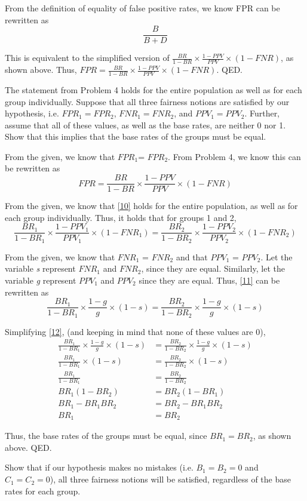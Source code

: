 \documentclass{cisXXX} %
\begin{document}
From the definition of equality of false positive rates, we know FPR can be rewritten as
$$\frac{B}{B+D}$$

This is equivalent to the simplified version of $\frac{BR}{1-BR}\times\frac{1-PPV}{PPV}\times(1 -FNR)$, as shown above. Thus, $FPR = \frac{BR}{1-BR}\times\frac{1-PPV}{PPV}\times(1 -FNR)$. QED.

\HWproblem
The statement from Problem 4 holds for the entire population as well as for each group individually. Suppose that all three fairness notions are satisfied by our hypothesis, i.e. $FPR_1 = FPR_2$, $FNR_1 = FNR_2$, and $PPV_1 = PPV_2$. Further, assume that all of these values, as well as the base rates, are neither 0 nor 1. Show that this implies that the base rates of the groups must be equal.

From the given, we know that $FPR_1 $= $FPR_2$. From Problem 4, we know this can be rewritten as
\begin{equation}
\label{10} FPR = \frac{BR}{1-BR}\times\frac{1-PPV}{PPV}\times(1 -FNR)
\end{equation}

From the given, we know that \eqref{10} holds for the entire population, as well as for each group individually. Thus, it holds that for groups 1 and 2,
\begin{equation}
\label{11} \frac{BR_1}{1-BR_1}\times\frac{1-PPV_1}{PPV_1}\times(1 -FNR_1) = \frac{BR_2}{1-BR_2}\times\frac{1-PPV_2}{PPV_2}\times(1 -FNR_2)
\end{equation}

From the given, we know that $FNR_1$ = $FNR_2$ and that $PPV_1$ = $PPV_2$. Let the variable \textit{s} represent $FNR_1$ and $FNR_2$, since they are equal. Similarly, let the variable \textit{g} represent $PPV_1$ and $PPV_2$ since they are equal. Thus, \eqref{11} can be rewritten as
\begin{equation}
\label{12} \frac{BR_1}{1-BR_1}\times\frac{1-g}{g}\times(1 -s) = \frac{BR_2}{1-BR_2}\times\frac{1-g}{g}\times(1 -s)
\end{equation}

Simplifying \eqref{12}, (and keeping in mind that none of these values are 0),
\begin{align*}
\frac{BR_1}{1-BR_1}\times\frac{1-g}{g}\times(1 -s) &= \frac{BR_2}{1-BR_2}\times\frac{1-g}{g}\times(1 -s)\\
\frac{BR_1}{1-BR_1}\times(1 -s) &= \frac{BR_2}{1-BR_2}\times(1 -s)\\
\frac{BR_1}{1-BR_1} &= \frac{BR_2}{1-BR_2}\\
BR_1(1-BR_2) &= BR_2(1-BR_1)\\
BR_1 - BR_1BR_2 &= BR_2 - BR_1BR_2\\
BR_1 &= BR_2
\end{align*}

Thus, the base rates of the groups must be equal, since $BR_1 = BR_2$, as shown above. QED.

\HWproblem
Show that if our hypothesis makes no mistakes (i.e. $B_1 = B_2 = 0$ and $C_1 = C_2 = 0$), all three fairness notions will be satisfied, regardless of the base rates for each group.
\end{document}
